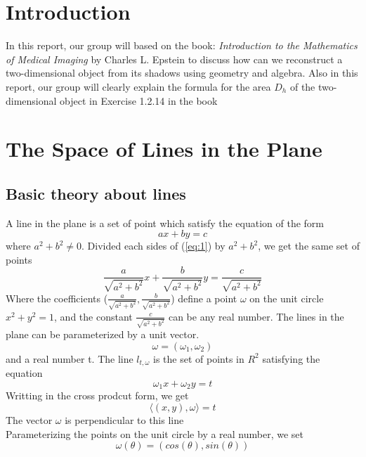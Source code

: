 \documentclass[a4paper]{article}
\begin{document}
\section{Introduction}
In this report, our group will based on the book:\textit{ Introduction to the Mathematics of Medical Imaging} by Charles L. Epstein to discuss how can we reconstruct a two-dimensional object from its shadows using geometry and algebra. Also in this report, our group will clearly explain the formula for the area $D_h$ of the two-dimensional object in Exercise 1.2.14 in the book
\section{The Space of Lines in the Plane}
\subsection{Basic theory about lines}
A line in the plane is a set of point which satisfy the equation of the form
\begin{equation}\label{eq:1}
    ax + by = c
\end{equation}
where $a^2+b^2\neq 0$. Divided each sides of (\ref{eq:1}) by $a^2+b^2$, we get the same set of points
\begin{equation*}
    \frac{a}{\sqrt{a^2+b^2}}x + \frac{b}{\sqrt{a^2+b^2}}y = \frac{c}{\sqrt{a^2+b^2}}
\end{equation*}
Where the coefficients ($\frac{a}{\sqrt{a^2+b^2}},\frac{b}{\sqrt{a^2+b^2}}$) define a point $\omega$ on the unit circle $x^2 + y^2 = 1$, and the constant $\frac{c}{\sqrt{a^2+b^2}}$ can be any real number. The lines in the plane can be parameterized by a unit vector.
\begin{equation*}
    \omega = (\omega_1,\omega_2)
\end{equation*}
and a real number t. The line $l_{t,\omega}$ is the set of points in $R^2$ satisfying the equation
\begin{equation*}
    \omega_1 x + \omega_2 y = t
\end{equation*}
Writting in the cross prodcut form, we get
\begin{equation}\label{eq:3}
    \langle (x,y), \omega \rangle = t
\end{equation}
The vector $\omega$ is perpendicular to this line\\ 
Parameterizing the points on the unit circle by a real number, we set
\begin{equation}\label{paraomega}
    \omega(\theta) = (cos(\theta),sin(\theta))
\end{equation}
\end{document}
